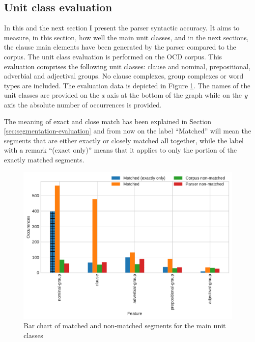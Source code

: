 \subsection{Unit class evaluation}
\label{sec:unit-class-evaluation}
    In this and the next section I present the parser syntactic accuracy. It aims to measure, in this section, how well the main unit classes, and in the next sections, the clause main elements have been generated by the parser compared to the corpus. The unit class evaluation is performed on the OCD corpus. This evaluation comprises the following unit classes: clause and nominal, prepositional, adverbial and adjectival groups. No clause complexes, group complexes or word types are included. The evaluation data is depicted in Figure \ref{fig:unit-types-data}. The names of the unit classes are provided on the \textit{x} axis at the bottom of the graph while on the \textit{y} axis the absolute number of occurrences is provided. 
    
    The meaning of exact and close match has been explained in Section \ref{sec:segmentation-evaluation} and from now on the label ``Matched'' will mean the segments that are either exactly or closely matched all together, while the label with a remark ``(exact only)'' means that it applies to only the portion of the exactly matched segments. 
    
    
    \begin{figure}[!ht]
    \centering
    \includegraphics[width=.85\textwidth]{evaluation-results/figures/unit-types-data.pdf}
    \caption{Bar chart of matched and non-matched segments for the main unit classes}
    \label{fig:unit-types-data}
    \end{figure}
    

